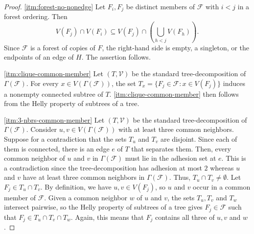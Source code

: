 \documentclass[11pt]{article}
\theoremstyle{remark}
\begin{document}
\begin{proof}
    \ref{itm:forest-no-nonedge} Let $F_i,F_j$ be distinct members of $\mathcal{F}$ with $i<j$ in a forest ordering. Then
        \[V(F_j)\cap V(F_i) \subseteq V(F_j)\cap\left(\bigcup_{h<j}V(F_h)\right).\]
    Since $\mathcal{F}$ is a forest of copies of $F$, the right-hand side is empty, a singleton, or the endpoints of an edge of $H$. 
    The assertion follows.

    
    \ref{itm:clique-common-member} Let $(T, \mathcal{V})$ be the standard tree-decomposition of $\Gamma(\mathcal{F})$.
    For every $x \in V(\Gamma(\mathcal{F}))$, the set $T_x = \{F_j \in \mathcal{F} : x \in V(F_j)\}$ induces a nonempty connected subtree of $T$.
    \cref{itm:clique-common-member} then follows from the Helly property of subtrees of a tree.
    
    \ref{itm:3-nbrs-common-member} Let $(T, \mathcal{V})$ be the standard tree-decomposition of $\Gamma(\mathcal{F})$.
    Consider $u, v \in V(\Gamma(\mathcal{F}))$ with at least three common neighbors.
    Suppose for a contradiction that the sets $T_u$ and $T_v$ are disjoint.
    Since each of them is connected, there is an edge $e$ of $T$ that separates them.
    Then, every common neighbor of $u$ and $v$ in $\Gamma(\mathcal{F})$ must lie in the adhesion set at $e$.
    This is a contradiction since the tree-decomposition has adhesion at most $2$ whereas $u$ and $v$ have at least three common neighbors in $\Gamma(\mathcal{F})$.
    Thus, $T_u \cap T_v \neq \emptyset$.
    Let $F_j \in T_u \cap T_v$. 
    By definition, we have $u, v \in V(F_j)$, so $u$ and $v$ occur in a common member of $\mathcal{F}$.
    Given a common neighbor $w$ of $u$ and $v$, the sets $T_u, T_v$ and $T_w$ intersect pairwise, so the Helly property of subtrees of a tree gives $F_j \in \mathcal{F}$ such that $F_j \in T_u \cap T_v \cap T_w$.
    Again, this means that $F_j$ contains all three of $u, v$ and $w$.
    

\end{proof}
\end{document}

